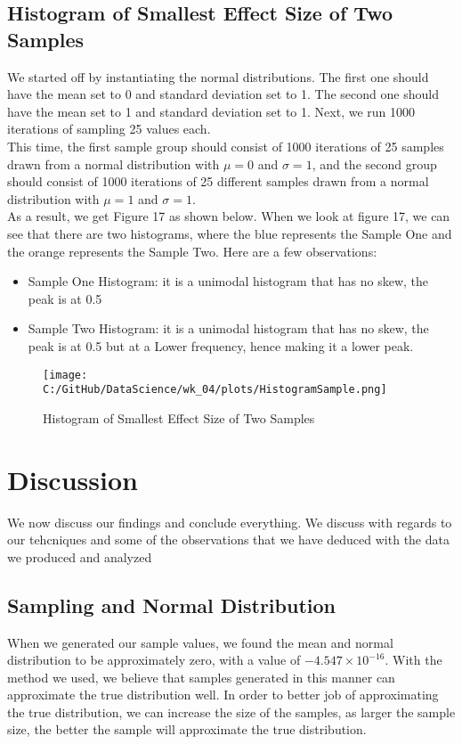 \documentclass[a4paper,twocolumn]{article}
\begin{document}
\subsection{Histogram of Smallest Effect Size of Two Samples }

We started off by instantiating the normal distributions. The first one should have the mean set to 0 and
standard deviation set to 1. The second one should have the mean set to 1 and standard deviation set to 1. 
Next, we run 1000 iterations of sampling 25 values each. \\

This time, the first sample group should consist of 1000 iterations of 25 samples drawn from a normal distribution 
with $\mu = 0$ and $\sigma = 1$, and the second group should consist of 1000 iterations of 25 different samples 
drawn from a normal distribution with $\mu = 1$ and $\sigma = 1$. \\

As a result, we get Figure 17 as shown below. When we look at figure 17, we can see that there are two histograms,
where the blue represents the Sample One and the orange represents the Sample Two. Here are a few observations:
\begin{itemize}
    \item Sample One Histogram: it is a unimodal histogram that has no skew, the peak is at 0.5
    \item Sample Two Histogram: it is a unimodal histogram that has no skew, the peak is at 0.5 but at a Lower
    frequency, hence making it a lower peak. 
\end{itemize}

\begin{figure}[htbp] 
    \centering
    \noindent
    \texttt{[image: C:/GitHub/DataScience/wk\_04/plots/HistogramSample.png]}
    \caption{Histogram of Smallest Effect Size of Two Samples} 
\end{figure}

\section{Discussion}
We now discuss our findings and conclude everything. We discuss with regards to our tehcniques and some of the
observations that we have deduced with the data we produced and analyzed

\subsection{Sampling and Normal Distribution}
When we generated our sample values, we found the mean and normal distribution to be approximately zero, 
with a value of \( -4.547 \times 10^{-16} \). With the method we used, we believe that samples generated in this 
manner can approximate the true distribution well. In order to better job of approximating the true distribution,
we can increase the size of the samples, as larger the sample size, the better the sample will approximate the
true distribution. 
\end{document}
